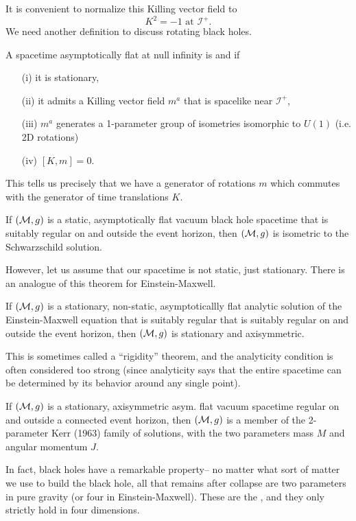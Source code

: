 It is convenient to normalize this Killing vector field to
\begin{equation}
    K^2 = -1 \text{ at } \mathcal{I}^+.
\end{equation}
We need another definition to discuss rotating black holes.
\begin{defn}
    A spacetime asymptotically flat at null infinity is  and  if 
    \begin{enumerate}
        \item[(i)] it is stationary,
        \item[(ii)] it admits a Killing vector field $m^a$ that is spacelike near $\mathcal{I}^+$,
        \item[(iii)] $m^a$ generates a 1-parameter group of isometries isomorphic to $U(1)$ (i.e. 2D rotations)
        \item[(iv)] $[K,m]=0$.
    \end{enumerate}
\end{defn}
This tells us precisely that we have a generator of rotations $m$ which commutes with the generator of time translations $K$.
\begin{thm}
    If $(\mathcal{M},g)$ is a static, asymptotically flat vacuum black hole spacetime that is suitably regular on and outside the event horizon, then $(\mathcal{M},g)$ is isometric to the Schwarzschild solution.
\end{thm}
However, let us assume that our spacetime is not static, just stationary. There is an analogue of this theorem for Einstein-Maxwell.
\begin{thm}
    If $(\mathcal{M},g)$ is a stationary, non-static, asymptoticallly flat analytic solution of the Einstein-Maxwell equation that is suitably regular that is suitably regular on and outside the event horizon, then $(\mathcal{M},g)$ is stationary and axisymmetric.
\end{thm}
This is sometimes called a ``rigidity'' theorem, and the analyticity condition is often considered too strong (since analyticity says that the entire spacetime can be determined by its behavior around any single point).
\begin{thm}
    If $(\mathcal{M},g)$ is a stationary, axisymmetric asym. flat vacuum spacetime regular on and outside a connected event horizon, then $(\mathcal{M},g)$ is a member of the 2-parameter Kerr (1963) family of solutions, with the two parameters mass $M$ and angular momentum $J$.
\end{thm}
In fact, black holes have a remarkable property-- no matter what sort of matter we use to build the black hole, all that remains after collapse are two parameters in pure gravity (or four in Einstein-Maxwell). These are the , and they only strictly hold in four dimensions.

